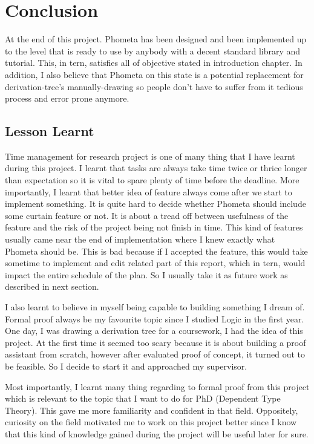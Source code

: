 \documentclass[master.tex]{subfiles}
\begin{document}
\chapter{Conclusion}

At the end of this project. Phometa has been designed and been implemented up to
the level that is ready to use by anybody with a decent standard library and
tutorial. This, in tern, satisfies all of objective stated in introduction
chapter. In addition, I also believe that Phometa on this state is a potential
replacement for derivation-tree's manually-drawing so people don't have to
suffer from it tedious process and error prone anymore.

\section{Lesson Learnt}

Time management for research project is one of many thing that I have learnt
during this project. I learnt that tasks are always take time twice or thrice
longer than expectation so it is vital to spare plenty of time before the
deadline. More importantly, I learnt that better idea of feature always come
after we start to implement something. It is quite hard to decide whether
Phometa should include some curtain feature or not. It is about a tread off
between usefulness of the feature and the risk of the project being not finish
in time. This kind of features usually came near the end of implementation where
I knew exactly what Phometa should be. This is bad because if I accepted the
feature, this would take sometime to implement and edit related part of this
report, which in tern, would impact the entire schedule of the plan. So I
usually take it as future work as described in next section.

I also learnt to believe in myself being capable to building something I dream
of. Formal proof always be my favourite topic since I studied Logic in the first
year. One day, I was drawing a derivation tree for a coursework, I had the idea
of this project. At the first time it seemed too scary because it is about
building a proof assistant from scratch, however after evaluated proof of
concept, it turned out to be feasible. So I decide to start it and approached my
supervisor.

Most importantly, I learnt many thing regarding to formal proof from this
project which is relevant to the topic that I want to do for PhD (Dependent Type
Theory). This gave me more familiarity and confident in that field. Oppositely,
curiosity on the field motivated me to work on this project better since I know
that this kind of knowledge gained during the project will be useful later for
sure.
\end{document}
